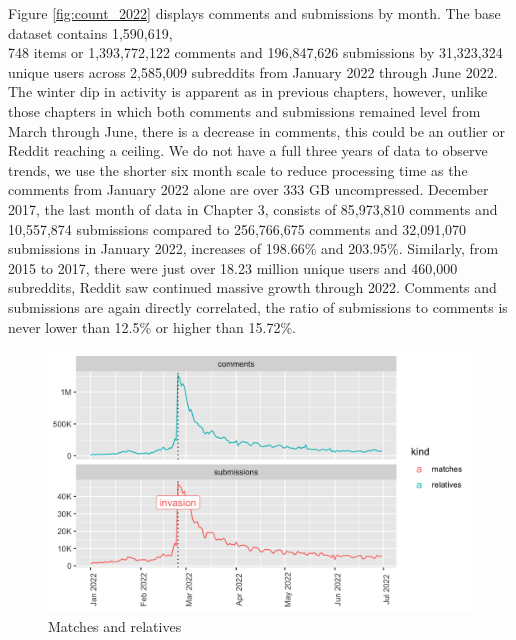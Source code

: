 \documentclass[doublespacing]{utdthesis}
\begin{document}
Figure \ref{fig:count_2022} displays comments and submissions by month.
The base dataset contains 1,590,619,\\748 items or 1,393,772,122 comments and 196,847,626 submissions by 31,323,324 unique users across 2,585,009 subreddits from January 2022 through June 2022.
The winter dip in activity is apparent as in previous chapters, however, unlike those chapters in which both comments and submissions remained level from March through June, there is a decrease in comments, this could be an outlier or Reddit reaching a ceiling.
We do not have a full three years of data to observe trends, we use the shorter six month scale to reduce processing time as the comments from January 2022 alone are over 333 GB uncompressed.
December 2017, the last month of data in Chapter 3, consists of 85,973,810 comments and 10,557,874 submissions compared to 256,766,675 comments and 32,091,070 submissions in January 2022, increases of 198.66\% and 203.95\%.
Similarly, from 2015 to 2017, there were just over 18.23 million unique users and 460,000 subreddits, Reddit saw continued massive growth through 2022.
Comments and submissions are again directly correlated, the ratio of submissions to comments is never lower than 12.5\% or higher than 15.72\%.

\begin{figure}[h]
\centering
\includegraphics[width=\textwidth]{2022/match}
\caption{Matches and relatives}
\label{fig:matches_2022}
\end{figure}
\end{document}
